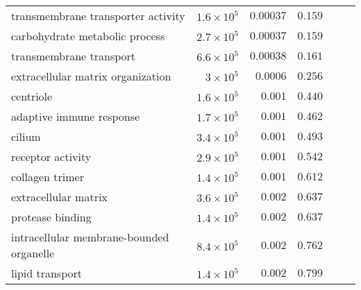 \documentclass{article}
\begin{document}
\begin{longtable}{|l|r|r|r|r|r|}
       transmembrane transporter activity & $1.6\times 10^{5}$ &            $0.00037$ &                     $ 0.159~~$ \\
           carbohydrate metabolic process & $2.7\times 10^{5}$ &            $0.00037$ &                     $ 0.159~~$ \\
                  transmembrane transport & $6.6\times 10^{5}$ &            $0.00038$ &                     $ 0.161~~$ \\
        extracellular matrix organization &  $ 3\times 10^{5}$ &             $0.0006$ &                     $ 0.256~~$ \\
                                centriole & $1.6\times 10^{5}$ &             $ 0.001$ &                     $ 0.440~~$ \\
                 adaptive immune response & $1.7\times 10^{5}$ &             $ 0.001$ &                     $ 0.462~~$ \\
                                   cilium & $3.4\times 10^{5}$ &             $ 0.001$ &                     $ 0.493~~$ \\
                        receptor activity & $2.9\times 10^{5}$ &             $ 0.001$ &                     $ 0.542~~$ \\
                          collagen trimer & $1.4\times 10^{5}$ &             $ 0.001$ &                     $ 0.612~~$ \\
                     extracellular matrix & $3.6\times 10^{5}$ &             $ 0.002$ &                     $ 0.637~~$ \\
                         protease binding & $1.4\times 10^{5}$ &             $ 0.002$ &                     $ 0.637~~$ \\
 intracellular membrane-bounded organelle & $8.4\times 10^{5}$ &             $ 0.002$ &                     $ 0.762~~$ \\
                          lipid transport & $1.4\times 10^{5}$ &             $ 0.002$ &                     $ 0.799~~$ \\
\end{longtable}
\end{document}
